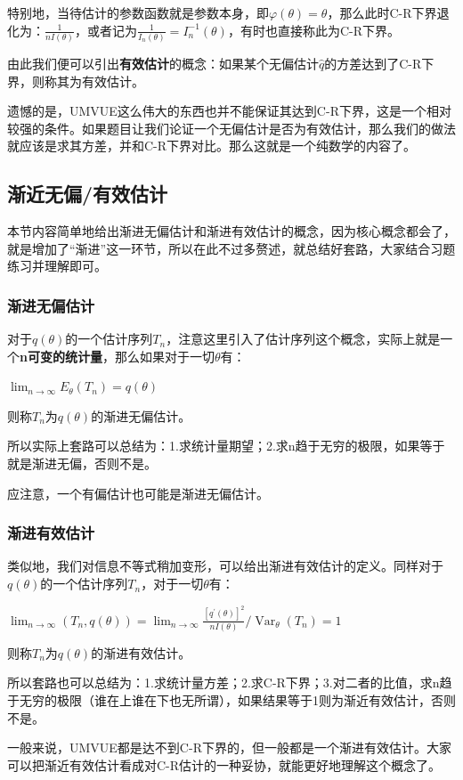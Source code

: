 \documentclass[10pt, a4paper]{article}
\begin{document}
特别地，当待估计的参数函数就是参数本身，即$\varphi(\theta) = \theta$，那么此时C-R下界退化为：$ \frac{1}{n I(\theta)}$，或者记为$ \frac{1}{I_n(\theta)}=I_n^{-1}(\theta)$，有时也直接称此为C-R下界。

由此我们便可以引出\textbf{有效估计}的概念：如果某个无偏估计$\hat q$的方差达到了C-R下界，则称其为有效估计。\par

遗憾的是，UMVUE这么伟大的东西也并不能保证其达到C-R下界，这是一个相对较强的条件。如果题目让我们论证一个无偏估计是否为有效估计，那么我们的做法就应该是求其方差，并和C-R下界对比。那么这就是一个纯数学的内容了。

\subsection{渐近无偏/有效估计}
本节内容简单地给出渐进无偏估计和渐进有效估计的概念，因为核心概念都会了，就是增加了“渐进”这一环节，所以在此不过多赘述，就总结好套路，大家结合习题练习并理解即可。

\subsubsection{渐进无偏估计}
对于$q(\theta)$的一个估计序列${T_n}$，注意这里引入了估计序列这个概念，实际上就是一个\textbf{n可变的统计量}，那么如果对于一切$\theta$有：

\begin{center}
$\lim _{n \rightarrow \infty} E_{\theta}\left(T_{n}\right)=q(\theta)$    
\end{center}
则称$T_n$为$q(\theta)$的渐进无偏估计。\par
所以实际上套路可以总结为：1.求统计量期望；2.求n趋于无穷的极限，如果等于就是渐进无偏，否则不是。\par
应注意，一个有偏估计也可能是渐进无偏估计。

\subsubsection{渐进有效估计}

类似地，我们对信息不等式稍加变形，可以给出渐进有效估计的定义。同样对于$q(\theta)$的一个估计序列${T_n}$，对于一切$\theta$有：
\begin{center}
    $\lim _{n \rightarrow \infty}\left(T_{n}, q(\theta)\right)=\lim _{n \rightarrow \infty} \frac{\left[q^{\prime}(\theta)\right]^{2}}{n I(\theta)} / \operatorname{Var}_{\theta}\left(T_{n}\right)=1$    
\end{center}
则称$T_n$为$q(\theta)$的渐进有效估计。\par
所以套路也可以总结为：1.求统计量方差；2.求C-R下界；3.对二者的比值，求n趋于无穷的极限（谁在上谁在下也无所谓），如果结果等于1则为渐近有效估计，否则不是。\par
一般来说，UMVUE都是达不到C-R下界的，但一般都是一个渐进有效估计。大家可以把渐近有效估计看成对C-R估计的一种妥协，就能更好地理解这个概念了。
\end{document}
